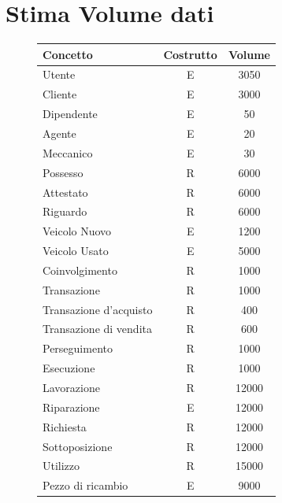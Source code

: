 \documentclass[a4paper,12pt]{report}
\begin{document}
\section{Stima Volume dati}
\begin{figure}[H]
	\fontsize{14pt}{12pt}\selectfont
	\advance\leftskip-15cm
	\centering
	\begin{tabular}{l c c }
		\rowcolor{BlueGreen}
		\rule[-3mm]{0mm}{0.85cm}
		\textbf{Concetto} & \textbf{Costrutto} &\textbf{Volume} \\
		\hline\rule[-2mm]{0mm}{0.75cm}
		Utente & E & 3050\\
		\hline\rule[-2mm]{0mm}{0.75cm}
		Cliente & E & 3000 \\
		\hline\rule[-2mm]{0mm}{0.75cm}
		Dipendente & E & 50\\
		\hline\rule[-2mm]{0mm}{0.75cm}
		Agente & E & 20\\
		\hline\rule[-2mm]{0mm}{0.75cm}
		Meccanico & E & 30\\
		\hline\rule[-2mm]{0mm}{0.75cm}
		Possesso & R & 6000 \\
		\hline\rule[-2mm]{0mm}{0.75cm}
		Attestato & R & 6000\\
		\hline\rule[-2mm]{0mm}{0.75cm}
		Riguardo & R & 6000 \\
		\hline\rule[-2mm]{0mm}{0.75cm}
		Veicolo Nuovo & E & 1200 \\
		\hline\rule[-2mm]{0mm}{0.75cm}
		Veicolo Usato & E & 5000 \\
		\hline\rule[-2mm]{0mm}{0.75cm}
		Coinvolgimento & R & 1000\\
		\hline\rule[-2mm]{0mm}{0.75cm}
		Transazione & R & 1000\\
		\hline\rule[-2mm]{0mm}{0.75cm}
		Transazione d'acquisto& R & 400\\
		\hline\rule[-2mm]{0mm}{0.75cm}
		Transazione di vendita& R & 600\\
		\hline\rule[-2mm]{0mm}{0.75cm}
		Perseguimento & R & 1000\\
		\hline\rule[-2mm]{0mm}{0.75cm}
		Esecuzione & R & 1000\\
		\hline\rule[-2mm]{0mm}{0.75cm}
		Lavorazione & R & 12000\\
		\hline\rule[-2mm]{0mm}{0.75cm}
		Riparazione & E & 12000\\
		\hline\rule[-2mm]{0mm}{0.75cm}
		Richiesta & R & 12000\\
		\hline\rule[-2mm]{0mm}{0.75cm}
		Sottoposizione & R & 12000\\
		\hline\rule[-2mm]{0mm}{0.75cm}
		Utilizzo & R & 15000\\
		\hline\rule[-2mm]{0mm}{0.75cm}
		Pezzo di ricambio & E &  9000\\
		\hline
	\end{tabular}
\end{figure}
\end{document}
